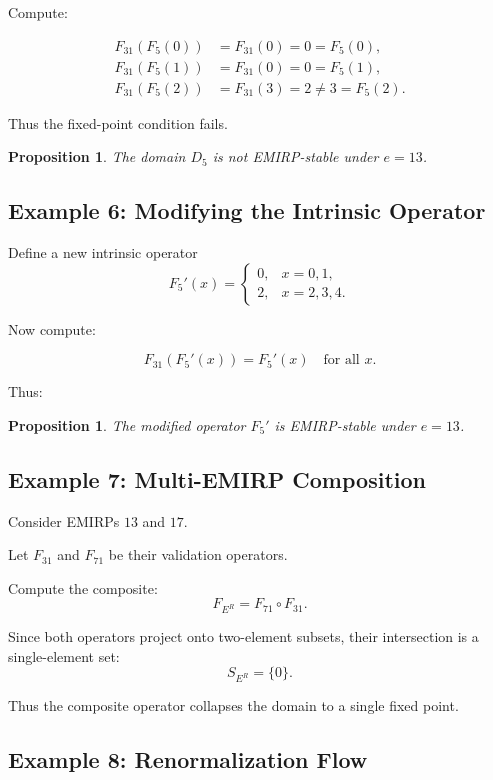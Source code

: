 \documentclass[11pt]{article}
\theoremstyle{definition}
\theoremstyle{plain}
\newtheorem{proposition}[definition]{Proposition}
\theoremstyle{remark}
\begin{document}
Compute:

\[
\begin{aligned}
F_{31}(F_5(0)) &= F_{31}(0) = 0 = F_5(0), \\
F_{31}(F_5(1)) &= F_{31}(0) = 0 = F_5(1), \\
F_{31}(F_5(2)) &= F_{31}(3) = 2 \neq 3 = F_5(2).
\end{aligned}
\]

Thus the fixed-point condition fails.

\begin{proposition}
The domain $D_5$ is not EMIRP-stable under $e = 13$.
\end{proposition}

\subsection{Example 6: Modifying the Intrinsic Operator}

Define a new intrinsic operator
\[
F_5'(x) =
\begin{cases}
0, & x = 0,1, \\
2, & x = 2,3,4.
\end{cases}
\]

Now compute:

\[
F_{31}(F_5'(x)) = F_5'(x)
\quad \text{for all } x.
\]

Thus:

\begin{proposition}
The modified operator $F_5'$ is EMIRP-stable under $e = 13$.
\end{proposition}

\subsection{Example 7: Multi-EMIRP Composition}

Consider EMIRPs $13$ and $17$.

Let $F_{31}$ and $F_{71}$ be their validation operators.

Compute the composite:
\[
F_{E^R} = F_{71} \circ F_{31}.
\]

Since both operators project onto two-element subsets, their intersection
is a single-element set:
\[
S_{E^R} = \{0\}.
\]

Thus the composite operator collapses the domain to a single fixed point.

\subsection{Example 8: Renormalization Flow}
\end{document}
